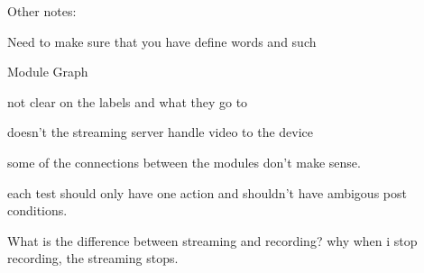 \documentclass{article}
\begin{document}
Other notes:
\begin{itemize*}
    \item Need to make sure that you have define words and such
    \item Module Graph
    \begin{itemize*}
        \item not clear on the labels and what they go to
        \item doesn't the streaming server handle video to the device
        \item some of the connections between the modules don't make sense.
    \end{itemize*}
    \item each test should only have one action and shouldn't have ambigous
    post conditions.
    \item What is the difference between streaming and recording? why when i
    stop recording, the streaming stops.
\end{itemize*}

    
\end{document}
